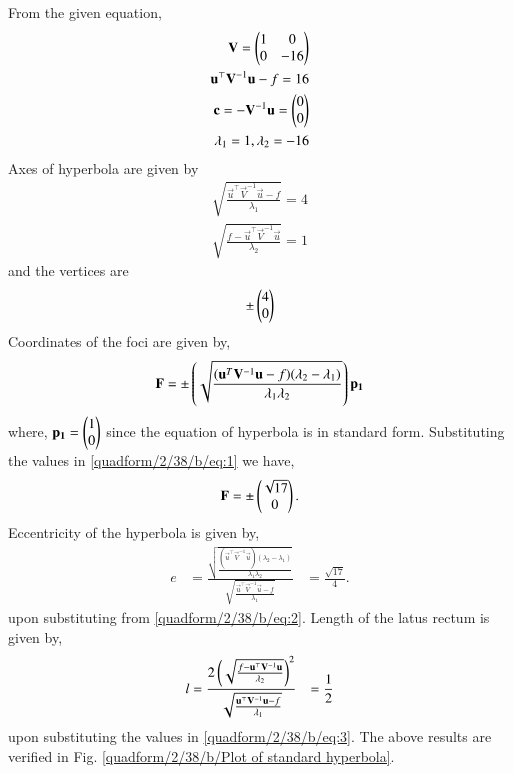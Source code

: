 
From the given equation, 
\begin{align}
    \mathbf{V} = \begin{pmatrix}1 & 0 \\ 0 & -16\end{pmatrix}
    \\
    \mathbf{u}^{\top}\mathbf{V}^{-1}\mathbf{u}-f = 16
    \\
    \mathbf{c} = -\mathbf{V}^{-1}\mathbf{u}=\begin{pmatrix}0 \\ 0\end{pmatrix}
    \\
    \lambda_1 = 1 , \lambda_2 = -16
\end{align}
Axes of hyperbola are given by
\begin{align}
    \sqrt{\frac{\vec{u}^{\top}\vec{V}^{-1}\vec{u}-f}{\lambda_1}} = 4\\ \sqrt{\frac{f-\vec{u}^{\top}\vec{V}^{-1}\vec{u}}{\lambda_2}} = 1
\end{align}
and the vertices are
\begin{align}
    \pm\begin{pmatrix}4 \\ 0\end{pmatrix} 
\end{align}
Coordinates of the foci are given by,
\begin{align}
  \mathbf{F} =\pm\left(\sqrt{\frac{(\mathbf{u}^T\mathbf{V}^{-1}\mathbf{u}-f)(\lambda_2-\lambda_1)}{\lambda_1\lambda_2}}\right)\mathbf{p_1} \label{quadform/2/38/b/eq:1}
\end{align}
where, $\mathbf{p_1} = \begin{pmatrix}1 \\ 0\end{pmatrix}$ since the equation of hyperbola is in standard form.
Substituting the values in \eqref{quadform/2/38/b/eq:1} we have,
\begin{align}
    \mathbf{F} = \pm\begin{pmatrix}\sqrt{17} \\ 0\end{pmatrix}.
\end{align}
Eccentricity of the hyperbola is given by,
\begin{align}
   e &= \frac{\sqrt{\frac{(\vec{u}^{\top}\vec{V}^{-1}\vec{u})(\lambda_2-\lambda_1)}{\lambda_1\lambda_2}}}{\sqrt{\frac{\vec{u}^{\top}\vec{V}^{-1}\vec{u}-f}{\lambda_1}}} \label{quadform/2/38/b/eq:2}
   &= \frac{\sqrt{17}}{4}.
\end{align}
upon substituting from  \eqref{quadform/2/38/b/eq:2}.
Length of the latus rectum is given by,
\begin{align}
    l &= \frac{2\left({\sqrt{\frac{f-\mathbf{u}^{\top}\mathbf{V}^{-1}\mathbf{u}}{\lambda_2}}}\right)^2}{\sqrt{\frac{\mathbf{u}^{\top}\mathbf{V}^{-1}\mathbf{u}-f}{\lambda_1}}} \label{quadform/2/38/b/eq:3}
    &= \frac{1}{2}
\end{align}
upon substituting the values in \eqref{quadform/2/38/b/eq:3}.
The above results are verified in Fig. \ref{quadform/2/38/b/Plot of standard hyperbola}.

